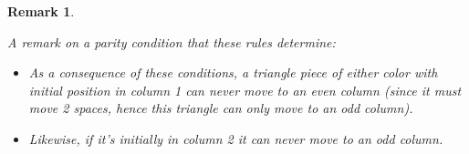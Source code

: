 \documentclass[14pt]{extarticle}
\newtheorem{remark}{Remark}
\begin{document}


\begin{remark}
\label{rmk:parity1}
{\rm
A remark on a parity condition that these rules determine:

\begin{itemize}
\item  
  As a consequence of these conditions, a triangle piece of either color
with initial position in column 1 can never move to an even column
(since it must move 2 spaces, hence this triangle can only move
to an odd column).

\item  
  Likewise, if it's initially in column 2 it can never move to an odd
  column.
\end{itemize}
}
\end{remark}
\end{document}

